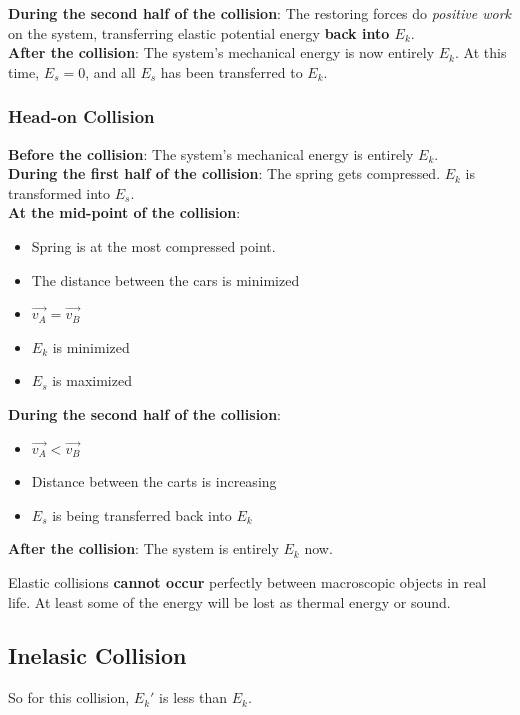 \textbf{During the second half of the collision}: The restoring forces do \textit{positive work} on the system, transferring 
elastic potential energy \textbf{back into $E_k$}.\\

\textbf{After the collision}: The system's mechanical energy is now entirely $E_k$. At this time, $E_s = 0$, and all $E_s$ has been transferred to $E_k$. 

\subsubsection{Head-on Collision} 
    \textbf{Before the collision}: The system's mechanical energy is entirely $E_k$.\\

\textbf{During the first half of the collision}: The spring gets compressed. $E_k$ is transformed into $E_s$.\\

\textbf{At the mid-point of the collision}: \begin{itemize}
    \item Spring is at the most compressed point.
    \item The distance between the cars is minimized
    \item $\vec{v_{A}} = \vec{v_{B}}$
    \item $E_k$ is minimized
    \item $E_s$ is maximized
\end{itemize}

\textbf{During the second half of the collision}: \begin{itemize}
    \item $\vec{v_A} < \vec{v_B}$
    \item Distance between the carts is increasing
    \item $E_s$ is being transferred back into $E_k$
\end{itemize}

\textbf{After the collision}:
The system is entirely $E_k$ now.

\begin{remark}
    Elastic collisions \textbf{cannot occur} perfectly between macroscopic objects in real life. At least some of the energy will be lost as thermal energy or sound. 
\end{remark}


\subsection{Inelasic Collision}
So for this collision, $E_k'$ is less than $E_k$.\\

